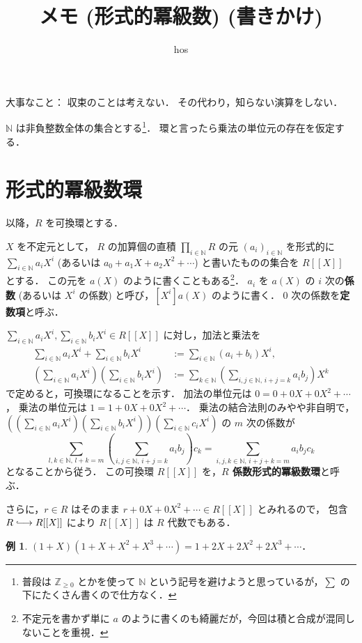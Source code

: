 \documentclass{jsarticle}
\title{メモ (形式的冪級数) (書きかけ)}
\author{hos}
\newcommand{\N}{\mathbb{N}}
\newcommand{\Z}{\mathbb{Z}}
\theoremstyle{definition}
\newtheorem*{Exm}{例}
\newenvironment{exm}{\begin{leftbar}\begin{Exm}}{\end{Exm}\end{leftbar}}
\begin{document}
\maketitle

大事なこと：
収束のことは考えない．
その代わり，知らない演算をしない．

$\N$ は非負整数全体の集合とする\footnote{普段は $\Z_{\ge 0}$ とかを使って $\N$ という記号を避けようと思っているが，$\sum$ の下にたくさん書くので仕方なく．}．
環と言ったら乗法の単位元の存在を仮定する．

\section{形式的冪級数環}
以降，$R$ を可換環とする．

$X$ を不定元として，
$R$ の加算個の直積 $\prod_{i\in\N} R$ の元 $(a_i)_{i\in\N}$ を形式的に
$\sum_{i\in\N} a_i X^i$ (あるいは $a_0 + a_1 X + a_2 X^2 + \cdots$) と書いたものの集合を $R[[X]]$ とする．
この元を $a(X)$ のように書くこともある\footnote{不定元を書かず単に $a$ のように書くのも綺麗だが，今回は積と合成が混同しないことを重視．}．
$a_i$ を $a(X)$ の $i$ 次の\textbf{係数} (あるいは $X^i$ の係数) と呼び，$[X^i] a(X)$ のように書く．
$0$ 次の係数を\textbf{定数項}と呼ぶ．

$\sum_{i\in\N} a_i X^i, \sum_{i\in\N} b_iX^i \in R[[X]]$ に対し，加法と乗法を
\begin{align*}
  \sum_{i\in\N} a_i X^i + \sum_{i\in\N} b_i X^i &:= \sum_{i\in\N} (a_i + b_i) X^i, \\
  \left(\sum_{i\in\N} a_i X^i\right) \left(\sum_{i\in\N} b_i X^i\right) &:= \sum_{k\in\N} \left(\sum_{i,j\in\N,\,i+j=k} a_i b_j\right) X^k
\end{align*}
で定めると，可換環になることを示す．
加法の単位元は $0 = 0 + 0 X + 0 X^2 + \cdots$，
乗法の単位元は $1 = 1 + 0 X + 0 X^2 + \cdots$．
乗法の結合法則のみやや非自明で，
$\left(\left(\sum_{i\in\N} a_i X^i\right) \left(\sum_{i\in\N} b_i X^i\right)\right) \left(\sum_{i\in\N} c_i X^i\right)$ の
$m$ 次の係数が
\[
  \sum_{l,k\in\N,\,l+k=m} \left(\sum_{i,j\in\N,\,i+j=k} a_i b_j\right) c_k = \sum_{i,j,k\in\N,\,i+j+k=m} a_i b_j c_k
\]
となることから従う．
この可換環 $R[[X]]$ を，\textbf{$R$ 係数形式的冪級数環}と呼ぶ．

さらに，$r \in R$ はそのまま $r + 0 X + 0 X^2 + \cdots \in R[[X]]$ とみれるので，
包含 $R \lhook\joinrel\longrightarrow R[[X]]$ により $R[[X]]$ は $R$ 代数でもある．

\begin{exm}
  $(1 + X) (1 + X + X^2 + X^3 + \cdots) = 1 + 2 X + 2 X^2 + 2 X^3 + \cdots$．
\end{exm}
\end{document}
